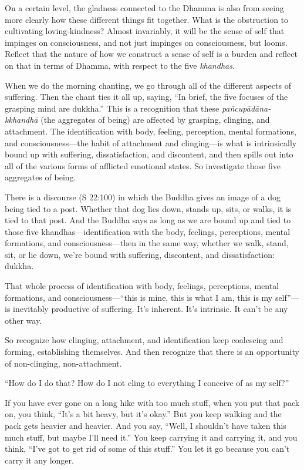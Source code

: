 On a certain level, the gladness connected to the Dhamma is also from
seeing more clearly how these different things fit together. What is the
obstruction to cultivating loving-kindness? Almost invariably, it will
be the sense of self that impinges on consciousness, and not just
impinges on consciousness, but looms. Reflect that the nature of how we
construct a sense of self is a burden and reflect on that in terms of
Dhamma, with respect to the five \emph{khandhas}.

When we do the morning chanting, we go through all of the different
aspects of suffering. Then the chant ties it all up, saying, “In brief,
the five focuses of the grasping mind are dukkha.” This is a recognition
that these \emph{pañcupādāna-kkhandhā} (the aggregates of being) are
affected by grasping, clinging, and attachment. The identification with
body, feeling, perception, mental formations, and consciousness—the
habit of attachment and clinging—is what is intrinsically bound up with
suffering, dissatisfaction, and discontent, and then spills out into all
of the various forms of afflicted emotional states. So investigate those
five aggregates of being.

There is a discourse (S 22:100) in which the Buddha gives an image of a
dog being tied to a post. Whether that dog lies down, stands up, sits,
or walks, it is tied to that post. And the Buddha says as long as we are
bound up and tied to those five khandhas—identification with the body,
feelings, perceptions, mental formations, and consciousness—then in the
same way, whether we walk, stand, sit, or lie down, we’re bound with
suffering, discontent, and dissatisfaction: dukkha.

That whole process of identification with body, feelings, perceptions,
mental formations, and consciousness—“this is mine, this is what I am,
this is my self”—is inevitably productive of suffering. It’s inherent.
It’s intrinsic. It can’t be any other way.

So recognize how clinging, attachment, and identification keep
coalescing and forming, establishing themselves. And then recognize that
there is an opportunity of non-clinging, non-attachment.

“How do I do that? How do I not cling to everything I conceive of as my
self?”

If you have ever gone on a long hike with too much stuff, when you put
that pack on, you think, “It’s a bit heavy, but it’s okay.” But you keep
walking and the pack gets heavier and heavier. And you say, “Well, I
shouldn’t have taken this much stuff, but maybe I’ll need it.” You keep
carrying it and carrying it, and you think, “I’ve got to get rid of some
of this stuff.” You let it go because you can’t carry it any longer.

